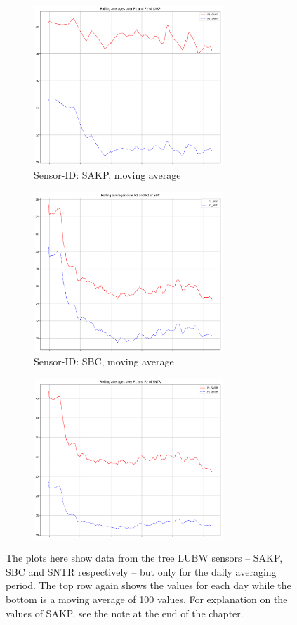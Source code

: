 \documentclass[12pt,a4paper,twoside]{scrartcl}
\numberwithin{equation}{section}
\begin{document}
\begin{figure}[H]
  \begin{subfigure}[t]{0.32\textwidth}
    \includegraphics[width=\textwidth,height=6cm]{figures/1D_SAKP_rolling_plot_}%
    \caption{Sensor-ID: SAKP, moving average}
  \end{subfigure}
  \begin{subfigure}[t]{0.32\textwidth}
    \includegraphics[width=\textwidth,height=6cm]{figures/1D_SBC_rolling_plot_}%
    \caption{Sensor-ID: SBC, moving average}
  \end{subfigure}
  \begin{subfigure}[t]{0.32\textwidth}
    \includegraphics[width=\textwidth,height=6cm]{figures/1D_SNTR_rolling_plot_}%
  \end{subfigure}      
  \caption[LUBW Data Plots]{The plots here show data from the tree LUBW sensors -- SAKP, SBC and SNTR respectively -- but only for the daily averaging period. The top row again shows the values for each day while the bottom is a moving average of 100 values. For explanation on the values of SAKP, see the note at the end of the chapter.}\label{fig:lubw-plots}
\end{figure}
\end{document}
